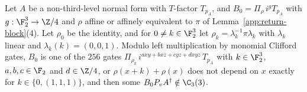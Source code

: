 Let $A$ be a non-third-level normal form with $T$-factor $T_{p_A}$, and $B_0=\Pi_\rho\,i^{g}T_{p_A}$ with $g:\F_2^3\to\Z/4$ and $\rho$ affine or affinely equivalent to $\pi$ of Lemma~\ref{app:return-block}\textup{(4)}. Let $\rho_0$ be the identity, and for $0\ne k\in\F_2^3$ let $\rho_k=\lambda_k^{-1}\pi\lambda_k$ with $\lambda_k$ linear and $\lambda_k(k)=(0,0,1)$. Modulo left multiplication by monomial Clifford gates, $B_0$ is one of the $256$ gates $\Pi_{\rho_k}\,i^{axy+bxz+cyz+dxyz}\,T_{p_A}$ with $k\in\F_2^3$, $a,b,c\in\F_2$ and $d\in\Z/4$, or $\rho(x+k)+\rho(x)$ does not depend on $x$ exactly for $k\in\{0,(1,1,1)\}$, and then some $B_0P_vA^\dagger\notin\C_3(3)$.
